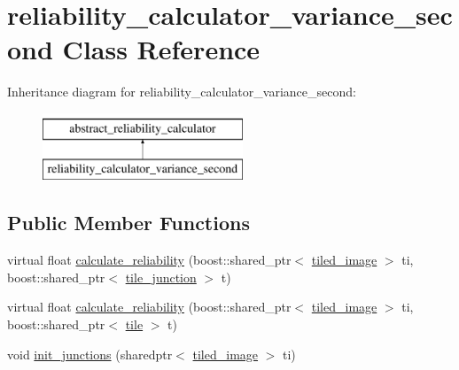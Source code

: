 \hypertarget{classreliability__calculator__variance__second}{\section{reliability\-\_\-calculator\-\_\-variance\-\_\-second Class Reference}
\label{classreliability__calculator__variance__second}
}
Inheritance diagram for reliability\-\_\-calculator\-\_\-variance\-\_\-second\-:\begin{figure}[H]
\begin{center}
\leavevmode
\includegraphics[height=2.000000cm]{classreliability__calculator__variance__second}
\end{center}
\end{figure}
\subsection*{Public Member Functions}
\begin{DoxyCompactItemize}
\item 
virtual float \hyperlink{classreliability__calculator__variance__second_a1150171c57a7b9420e5f5211e71c265a}{calculate\-\_\-reliability} (boost\-::shared\-\_\-ptr$<$ \hyperlink{classtiled__image}{tiled\-\_\-image} $>$ ti, boost\-::shared\-\_\-ptr$<$ \hyperlink{classtile__junction}{tile\-\_\-junction} $>$ t)
\item 
virtual float \hyperlink{classreliability__calculator__variance__second_a0cab62b334c6f20aa821496f7364bd98}{calculate\-\_\-reliability} (boost\-::shared\-\_\-ptr$<$ \hyperlink{classtiled__image}{tiled\-\_\-image} $>$ ti, boost\-::shared\-\_\-ptr$<$ \hyperlink{classtile}{tile} $>$ t)
\item 
void \hyperlink{classreliability__calculator__variance__second_a5c7dcb23c303a0ec762504ea9a775b2b}{init\-\_\-junctions} (sharedptr$<$ \hyperlink{classtiled__image}{tiled\-\_\-image} $>$ ti)
\end{DoxyCompactItemize}


